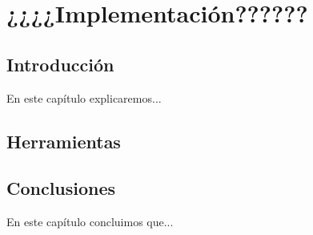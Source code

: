 \chapter{¿¿¿¿Implementación??????}\label{cap:implementacion}

\section{Introducción}
En este capítulo explicaremos...

\section {Herramientas}

\section{Conclusiones}
En este capítulo concluimos que...